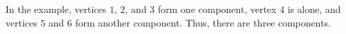In the example, vertices $1$, $2$, and $3$ form one component, vertex $4$ is alone, and vertices $5$ and $6$ form another component. Thus, there are three components.
